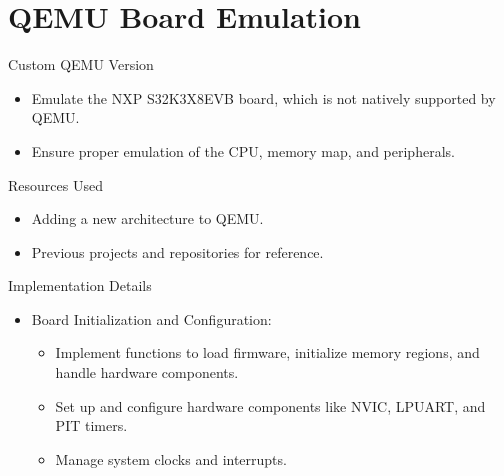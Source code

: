 
\section{QEMU Board Emulation}

\begin{frame}{Custom QEMU Version}
    \begin{itemize}
        \item Emulate the NXP S32K3X8EVB board, which is not natively supported by QEMU.
        \item Ensure proper emulation of the CPU, memory map, and peripherals.
    \end{itemize}
\end{frame}

\begin{frame}{Resources Used}
    \begin{itemize}
        \item Adding a new architecture to QEMU.
        \item Previous projects and repositories for reference.
    \end{itemize}
\end{frame}

\begin{frame}{Implementation Details}
    \begin{itemize}
        \item Board Initialization and Configuration:
        \begin{itemize}
            \item Implement functions to load firmware, initialize memory regions, and handle hardware components.
            \item Set up and configure hardware components like NVIC, LPUART, and PIT timers.
            \item Manage system clocks and interrupts.
        \end{itemize}
    \end{itemize}
\end{frame}

